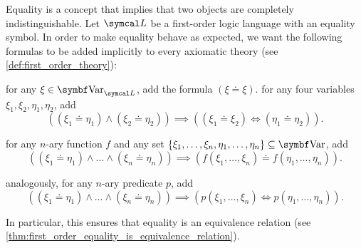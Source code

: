 \begin{remark}\label{remark:first_order_equality}
  Equality is a concept that implies that two objects are completely indistinguishable. Let \( \Cal{L} \) be a first-order logic language with an equality symbol. In order to make equality behave as expected, we want the following formulas to be added implicitly to every axiomatic theory (see \cref{def:first_order_theory}):

  \begin{defenum}
     for any \( \xi \in \Cat{Var}_{\Cal{L}} \), add the formula \( (\xi \doteq \xi) \).
     for any four variables \( \xi_1, \xi_2, \eta_1, \eta_2 \), add
    \begin{equation*}
      ((\xi_1 \doteq \eta_1) \land (\xi_2 \doteq \eta_2)) \implies ((\xi_1 \doteq \xi_2) \iff (\eta_1 \doteq \eta_2)).
    \end{equation*}

     for any \( n \)-ary function \( f \) and any set \( \{ \xi_1, \ldots, \xi_n, \eta_1, \ldots, \eta_n \} \subseteq \Cat{Var} \), add
    \begin{equation*}
      ((\xi_1 \doteq \eta_1) \land \ldots \land (\xi_n \doteq \eta_n)) \implies (f(\xi_1, \ldots, \xi_n) \doteq f(\eta_1, \ldots, \eta_n)).
    \end{equation*}

     analogously, for any \( n \)-ary predicate \( p \), add
    \begin{equation*}
      ((\xi_1 \doteq \eta_1) \land \ldots \land (\xi_n \doteq \eta_n)) \implies (p(\xi_1, \ldots, \xi_n) \iff p(\eta_1, \ldots, \eta_n)).
    \end{equation*}
  \end{defenum}

  In particular, this ensures that equality is an equivalence relation (see \cref{thm:first_order_equality_is_equivalence_relation}).
\end{remark}

